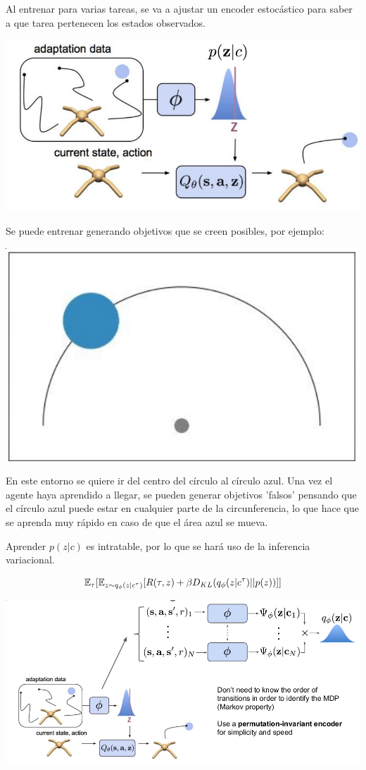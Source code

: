 Al entrenar para varias tareas, se va a ajustar un encoder estocástico para saber a que tarea
pertenecen los estados observados.

\begin{center}
\includegraphics[width=.6\textwidth]{figures/2020-07-25-194057_831x401_scrot.png}
\end{center}

Se puede entrenar generando objetivos que se creen posibles, por ejemplo:
\begin{center}
\includegraphics[width=.5\textwidth]{figures/2020-07-25-194442_594x356_scrot.png}
\end{center}
En este entorno se quiere ir del centro del círculo al círculo azul. Una vez el agente haya
aprendido a llegar, se pueden generar objetivos 'falsos' pensando que el círculo azul puede
estar en cualquier parte de la circunferencia, lo que hace que se aprenda muy rápido en caso
de que el área azul se mueva.

Aprender $p(z|c)$ es intratable, por lo que se hará uso de la inferencia variacional.

\begin{align}
    \mathbb{E}_{\tau}[\mathbb{E}_{z\sim q_{\phi}(z|c^\tau)}[R(\tau,z)+\beta
    D_{KL}(q_\phi(z|c^\tau)||p(z))]]
\end{align}

\begin{center}
\includegraphics[width=.7\textwidth]{figures/2020-07-25-195700_1006x465_scrot.png}
\end{center}

